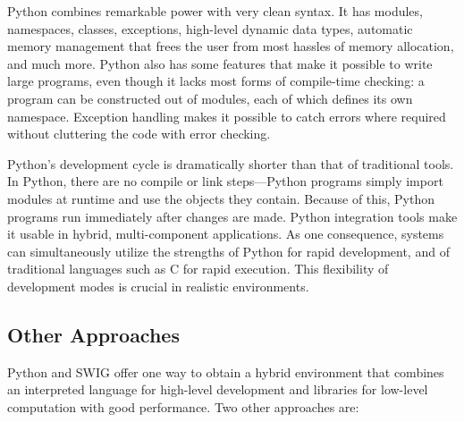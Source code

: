 \documentclass[acmtocl]{acmtrans2m}
\begin{document}
Python combines remarkable power with very clean syntax. It has
modules, namespaces, classes, exceptions, high-level dynamic data
types, automatic memory management that frees the user from most
hassles of memory allocation, and much more. Python also has some
features that make it possible to write large programs, even though it
lacks most forms of compile-time checking: a program can be
constructed out of modules, each of which defines its own
namespace. Exception handling makes it possible to catch errors where
required without cluttering the code with error checking.

Python's development cycle is dramatically shorter than that of
traditional tools. In Python, there are no compile or link
steps---Python programs simply import modules at runtime and use the
objects they contain. Because of this, Python programs run immediately
after changes are made. Python integration tools make it usable in
hybrid, multi-component applications. As one consequence, systems can
simultaneously utilize the strengths of Python for rapid development,
and of traditional languages such as C for rapid execution.  This
flexibility of development modes is crucial in realistic environments.

\subsection{Other Approaches}

Python and SWIG offer one way to obtain a hybrid environment that
combines an interpreted language for high-level development and
libraries for low-level computation with good performance.  Two other
approaches are:
\end{document}
